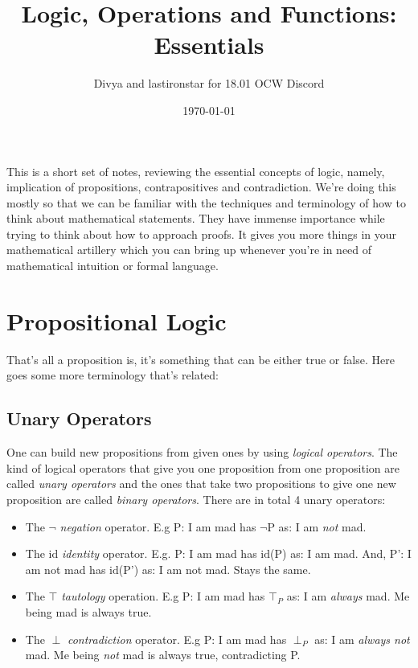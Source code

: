 \documentclass{article}
\title{\textbf{Logic, Operations and Functions: Essentials}}
\date{\today}
\author{Divya and lastironstar for 18.01 OCW Discord}
\begin{document}
\maketitle
\tableofcontents

\noindent
This is a short set of notes, reviewing the essential concepts of logic, namely, implication of propositions, contrapositives and contradiction. We're doing this mostly so that we can be familiar with the techniques and terminology of how to think about mathematical statements. They have immense importance while trying to think about how to approach proofs. It gives you more things in your mathematical artillery which you can bring up whenever you're in need of mathematical intuition or formal language. 

\section{Propositional Logic}


That's all a proposition is, it's something that can be either true or false. Here goes some more terminology that's related:


\subsection{Unary Operators}
One can build new propositions from given ones by using \textit{logical operators}. The kind of logical operators that give you one proposition from one proposition are called \textit{unary operators} and the ones that take two propositions to give one new proposition are called \textit{binary operators}. There are in total 4 unary operators:
\begin{itemize}
	\item The $\neg$ \textit{negation} operator. E.g P: I am mad has $\neg$P as: I am \textit{not} mad. 
	\item The $\mathrm{id}$ \textit{identity} operator. E.g. P: I am mad has $\mathrm{id}$(P) as: I am mad. And, P': I am not mad has $\mathrm{id}$(P') as: I am not mad. Stays the same. 
	\item The $\top$ \textit{tautology} operation. E.g P: I am mad has $\top_{P}$ as: I am \textit{always} mad. Me being mad is always true. 
	\item The $\perp$ \textit{contradiction} operator. E.g P: I am mad has $\perp_{P}$ as: I am \textit{always not} mad. Me being \textit{not} mad is always true, contradicting P. 
\end{itemize}
\end{document}
